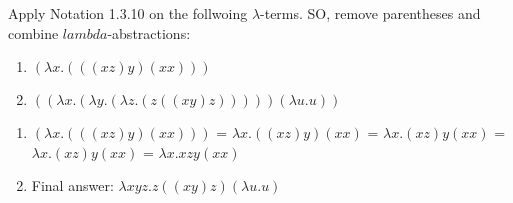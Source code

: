 \begin{problem}{1.1}
    Apply Notation 1.3.10 on the follwoing $\lambda$-terms. SO, remove parentheses and combine $lambda$-abstractions:
    \begin{enumerate}[label=$(\alph*)$]
        \item $(\lambda x.(((xz)y)(xx)))$
        \item $((\lambda x.(\lambda y.(\lambda z .(z((xy)z)))))(\lambda u.u))$
    \end{enumerate}
\end{problem}

\begin{solution}
    \begin{enumerate}[label=$(\alph*)$]
        \item $(\lambda x.(((xz)y)(xx)))$ = $\lambda x. ((xz)y)(xx)$ = $\lambda x. (xz)y(xx)$ = $\lambda x. (xz)y(xx)$ = $\lambda x. xzy(xx)$
        \item Final answer: $\lambda xyz. z((xy)z)(\lambda u.u)$
    \end{enumerate}
\end{solution}
